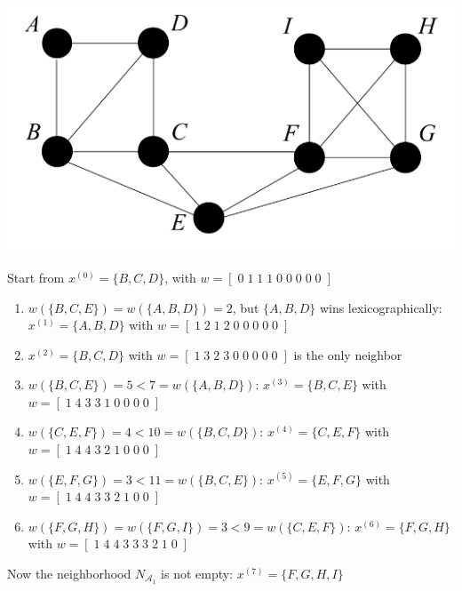 \documentclass[11pt]{article}
\begin{document}
	\newpage
	
	\begin{center}
		\includegraphics[width=0.6\columnwidth]{img/MCP2}
	\end{center}
	
	Start from $x^{(0)} = \{B, C , D\}$, with $w = [\; 0 \; 1 \; 1\; 1\; 0\; 0\; 0\; 0\; 0\; ]$
	\begin{enumerate}
		\item $w (\{B, C , E \}) = w (\{A, B, D\}) = 2$, but $\{A, B, D\}$ wins lexicographically: $x^{(1)} = \{A, B, D\}$ with $w = [\; 1\; 2\; 1\; 2\; 0\; 0\; 0\; 0\; 0\; ]$
		
		\item $x^{(2)} = \{B, C , D\}$ with $w = [\; 1\; 3\; 2\; 3\; 0\; 0\; 0\; 0\; 0\; ]$ is the only neighbor
		
		\item $w (\{B, C , E \}) = 5 < 7 = w (\{A, B, D\})$: $x^{(3)} = \{B, C , E \}$ with $w = [\; 1\; 4\; 3\; 3\; 1\; 0\; 0\; 0\; 0\; ]$
		
		\item $w (\{C , E , F \}) = 4 < 10 = w (\{B, C , D\})$: $x^{(4)} = \{C , E , F \}$ with $w = [\; 1\; 4\; 4\; 3\; 2\; 1\; 0\; 0\; 0\; ]$
		
		\item $w (\{E , F , G \}) = 3 < 11 = w (\{B, C , E \})$: $x^{(5)} = \{E , F , G \}$ with $w = [\; 1\; 4\; 4\; 3\; 3\; 2\; 1\; 0\; 0\; ]$
		
		\item $w (\{F , G , H\}) = w (\{F , G , I \}) = 3 < 9 = w (\{C , E , F \})$: $x^{(6)} = \{F , G , H\}$ with $w = [\; 1\; 4\; 4\; 3\; 3\; 3\; 2\; 1\; 0\; ]$
	\end{enumerate}
	
	Now the neighborhood $N_{\mathcal{A}_1}$ is not empty: $x^{(7)} = \{F , G , H, I \}$
	
	\newpage
	
\end{document}
